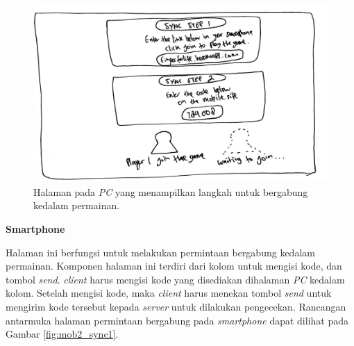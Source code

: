 \begin{enumerate}
\begin{figure}[H]
	\centering
	\includegraphics[scale=0.1]{Gambar/web2_sync}
	\caption{Halaman pada \textit{PC} yang menampilkan langkah untuk bergabung kedalam permainan.}
	\label{fig:web2_sync}
\end{figure}

	\textbf{Smartphone}
	
	Halaman ini berfungsi untuk melakukan permintaan bergabung kedalam permainan. Komponen halaman ini terdiri dari kolom untuk mengisi kode, dan tombol \textit{send}. \textit{client} harus mengisi kode yang disediakan dihalaman \textit{PC} kedalam kolom. Setelah mengisi kode, maka \textit{client} harus menekan tombol \textit{send} untuk mengirim kode tersebut kepada \textit{server} untuk dilakukan pengecekan. Rancangan antarmuka halaman permintaan bergabung pada \textit{smartphone} dapat dilihat pada Gambar \ref{fig:mob2_sync1}.
	

\end{enumerate}
